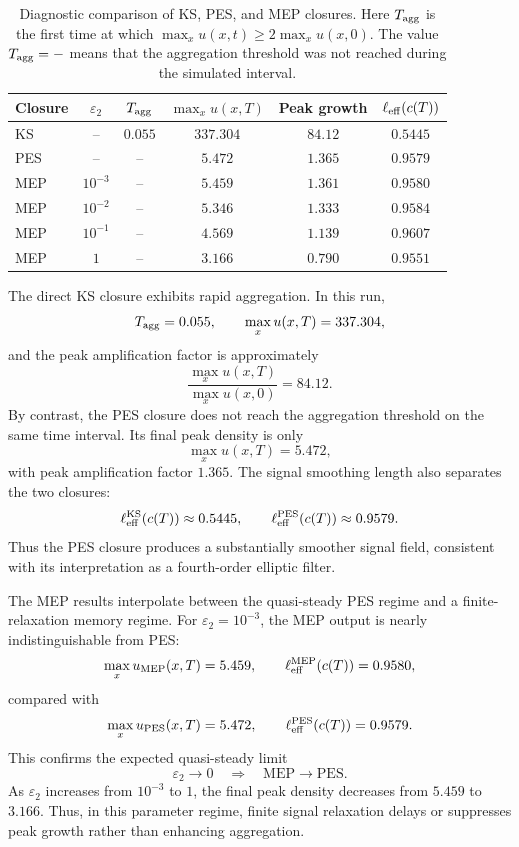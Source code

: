 \documentclass[pdflatex,sn-mathphys-num]{sn-jnl}%
\theoremstyle{thmstyleone}
\theoremstyle{thmstyletwo}
\theoremstyle{thmstylethree}
\begin{document}
\begin{table}[ht]
\centering
\small
\renewcommand{\arraystretch}{1.15}
\caption{Diagnostic comparison of KS, PES, and MEP closures.  Here
\(T_{\rm agg}\) is the first time at which
\(\max_x u(x,t)\ge 2\max_xu(x,0)\).  The value \(T_{\rm agg}=-\)
means that the aggregation threshold was not reached during the simulated
interval.}
\label{tab:diagnostic-KS-PES-MEP}
\begin{tabular}{@{}lccccc@{}}
\toprule
Closure & \(\varepsilon_2\) & \(T_{\rm agg}\) &
\(\max_x u(x,T)\) & Peak growth &
\(\ell_{\rm eff}(c(T))\) \\
\midrule
KS  & --          & \(0.055\) & \(337.304\) & \(84.12\) & \(0.5445\) \\
PES & --          & --        & \(5.472\)   & \(1.365\)  & \(0.9579\) \\
MEP & \(10^{-3}\) & --        & \(5.459\)   & \(1.361\)  & \(0.9580\) \\
MEP & \(10^{-2}\) & --        & \(5.346\)   & \(1.333\)  & \(0.9584\) \\
MEP & \(10^{-1}\) & --        & \(4.569\)   & \(1.139\)  & \(0.9607\) \\
MEP & \(1\)       & --        & \(3.166\)   & \(0.790\)  & \(0.9551\) \\
\bottomrule
\end{tabular}
\end{table}

The direct KS closure exhibits rapid aggregation.  In this run,
\[
        T_{\rm agg}=0.055,
        \qquad
        \max_x u(x,T)=337.304,
\]
and the peak amplification factor is approximately
\[
        \frac{\max_x u(x,T)}{\max_x u(x,0)}=84.12.
\]
By contrast, the PES closure does not reach the aggregation threshold on the
same time interval.  Its final peak density is only
\[
        \max_x u(x,T)=5.472,
\]
with peak amplification factor \(1.365\).  The signal smoothing length also
separates the two closures:
\[
        \ell_{\rm eff}^{\rm KS}(c(T))\approx0.5445,
        \qquad
        \ell_{\rm eff}^{\rm PES}(c(T))\approx0.9579.
\]
Thus the PES closure produces a substantially smoother signal field, consistent
with its interpretation as a fourth-order elliptic filter.

The MEP results interpolate between the quasi-steady PES regime and a
finite-relaxation memory regime.  For \(\varepsilon_2=10^{-3}\), the MEP output
is nearly indistinguishable from PES:
\[
        \max_x u_{\rm MEP}(x,T)=5.459,
        \qquad
        \ell_{\rm eff}^{\rm MEP}(c(T))=0.9580,
\]
compared with
\[
        \max_x u_{\rm PES}(x,T)=5.472,
        \qquad
        \ell_{\rm eff}^{\rm PES}(c(T))=0.9579.
\]
This confirms the expected quasi-steady limit
\[
        \varepsilon_2\to0
        \quad\Longrightarrow\quad
        \mathrm{MEP}\to\mathrm{PES}.
\]
As \(\varepsilon_2\) increases from \(10^{-3}\) to \(1\), the final peak density
decreases from \(5.459\) to \(3.166\).  Thus, in this parameter regime, finite
signal relaxation delays or suppresses peak growth rather than enhancing
aggregation.
\end{document}
